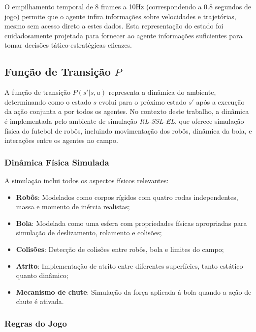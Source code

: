 O empilhamento temporal de 8 frames a 10Hz (correspondendo a 0.8 segundos de jogo) permite que o agente infira informações sobre velocidades e trajetórias, mesmo sem acesso direto a estes dados. Esta representação do estado foi cuidadosamente projetada para fornecer ao agente informações suficientes para tomar decisões tático-estratégicas eficazes.

\subsection{Função de Transição $P$}

A função de transição $P(s' | s, a)$ representa a dinâmica do ambiente, determinando como o estado $s$ evolui para o próximo estado $s'$ após a execução da ação conjunta $a$ por todos os agentes. No contexto deste trabalho, a dinâmica é implementada pelo ambiente de simulação \textit{RL-SSL-EL}, que oferece simulação física do futebol de robôs, incluindo movimentação dos robôs, dinâmica da bola, e interações entre os agentes no campo.

\subsubsection{Dinâmica Física Simulada}

A simulação inclui todos os aspectos físicos relevantes:

\begin{itemize}
    \item \textbf{Robôs}: Modelados como corpos rígidos com quatro rodas independentes, massa e momento de inércia realistas;
    \item \textbf{Bola}: Modelada como uma esfera com propriedades físicas apropriadas para simulação de deslizamento, rolamento e colisões;
    \item \textbf{Colisões}: Detecção de colisões entre robôs, bola e limites do campo;
    \item \textbf{Atrito}: Implementação de atrito entre diferentes superfícies, tanto estático quanto dinâmico;
    \item \textbf{Mecanismo de chute}: Simulação da força aplicada à bola quando a ação de chute é ativada.
\end{itemize}

\subsubsection{Regras do Jogo}

